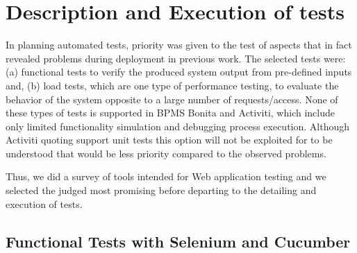 \documentclass[runningheads,a4paper]{llncs}
\begin{document}
\section{Description and Execution of tests}\label{s:testes}

In planning automated tests, priority was given to the test of aspects that in fact revealed problems during deployment in previous work. The selected tests were: (a) functional tests to verify the produced system output from pre-defined inputs and, (b) load tests, which are one type of performance testing, to evaluate the behavior of the system  opposite to a large number of requests/access. None of these types of tests is supported in BPMS Bonita and Activiti, which include only limited functionality simulation and debugging process execution. Although Activiti quoting support unit tests  this option will not be exploited for to be understood that would be less priority compared to the observed problems.

Thus, we did a survey of tools intended for Web application testing and we selected the judged most promising before departing to the detailing and execution of tests.%

\subsection{Functional Tests with Selenium and Cucumber}
\end{document}
